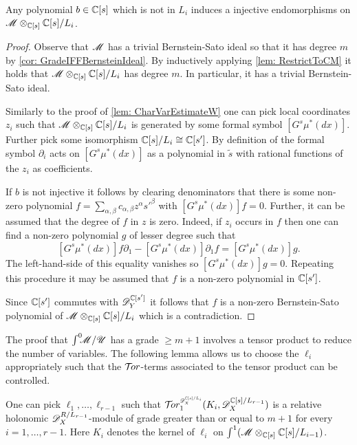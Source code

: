 \begin{lemma}\label{lem: InjectiveEll}
  Any polynomial $b\in \mathbb{C}[s]$ which is not in $L_i$ induces a injective endomorphisms on $\mathscr{M} \otimes_{\mathbb{C}[s]}\mathbb{C}[s]/L_i$.
\end{lemma}
\begin{proof}
  Observe that $\mathscr{M}$ has a trivial Bernstein-Sato ideal so that it has degree $m$ by \cref{cor: GradeIFFBernsteinIdeal}.
  By inductively applying \cref{lem: RestrictToCM} it holds that $\mathscr{M} \otimes_{\mathbb{C}[s]}\mathbb{C}[s]/L_i$ has degree $m$.
  In particular, it has a trivial Bernstein-Sato ideal.

  Similarly to the proof of \cref{lem: CharVarEstimateW} one can pick local coordinates $z_i$ such that $\mathscr{M} \otimes_{\mathbb{C}[s]}\mathbb{C}[s]/L_i$ is generated by some formal symbol $[G^s \mu^*(dx)]$.
  Further pick some isomorphism $\mathbb{C}[s]/L_i \cong \mathbb{C}[s']$.
  By definition of the formal symbol $\partial_i$ acts on $[G^s \mu^*(dx)]$ as a polynomial in $\widetilde{s}$ with rational functions of the $z_i$ as coefficients.

  If $b$ is not injective it follows by clearing denominators that there is some non-zero polynomial $f = \sum_{\alpha,\beta} c_{\alpha,\beta} z^\alpha s'^\beta$ with $[G^s \mu^*(dx)] f = 0$.
  Further, it can be assumed that the degree of $f$ in $z$ is zero.
  Indeed, if $z_i$ occurs in $f$ then one can find a non-zero polynomial $g$ of lesser degree such that
  $$[G^s \mu^*(dx)] f\partial_1 - [G^s \mu^*(dx)]\partial_1 f = [G^s \mu^*(dx)] g.$$
  The left-hand-side of this equality vanishes so $[G^s \mu^*(dx)] g = 0$.
  Repeating this procedure it may be assumed that $f$ is a non-zero polynomial in $\mathbb{C}[s']$.

  Since $\mathbb{C}[s']$ commutes with $\mathscr{D}_Y^{\mathbb{C}[s']}$ it follows that $f$ is a non-zero Bernstein-Sato polynomial of $\mathscr{M} \otimes_{\mathbb{C}[s]}\mathbb{C}[s]/L_i$ which is a contradiction.
\end{proof}
The proof that $\int^0 \mkern -8mu\mathscr{M}/\mathscr{U}$ has a grade $\geq m+1$ involves a tensor product to reduce the number of variables.
The following lemma allows us to choose the $\ell_i$ appropriately such that the $\mathcal{T}\mkern -3mu or$-terms associated to the tensor product can be controlled.
\begin{lemma}\label{lem: RelHolTorDegree}
  One can pick $\ell_1,\ldots,\ell_{r-1}$ such that $\Tr{\D_\X^{\C[s]/L_{i}} }{1}(K_i, \D_\X^{\C[s]/L_{r-1}})$ is a relative holonomic $\mathscr{D}_X^{R/L_{r-1}}$-module of grade greater than or equal to $m+1$ for every $i=1,\ldots, r-1$.
  Here $K_i$ denotes the kernel of $\ell_i$ on $\int^1 (\mathscr{M} \otimes_{\mathbb{C}[s]}\mathbb{C}[s]/L_{i-1})$.
\end{lemma}
